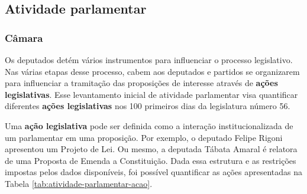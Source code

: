 \documentclass[12pt,a4paper]{article}
\begin{document}
\subsection{Atividade parlamentar}
\label{sec:atividade-parlamentar}

\subsubsection{Câmara}

Os deputados detém vários instrumentos para influenciar o processo legislativo. Nas várias etapas desse processo, cabem aos deputados e partidos se organizarem para influenciar a tramitação das proposições de interesse através de \textbf{ações legislativas}. Esse levantamento inicial de atividade parlamentar visa quantificar diferentes \textbf{ações legislativas} nos 100 primeiros dias da legislatura número 56.

Uma \textbf{ação legislativa} pode ser definida como a interação institucionalizada de um parlamentar em uma proposição. Por exemplo, o deputado Felipe Rigoni apresentou um Projeto de Lei. Ou mesmo, a deputada Tábata Amaral é relatora de uma Proposta de Emenda a Constituição. Dada essa estrutura e as restrições impostas pelos dados disponíveis, foi possível quantificar as ações apresentadas na Tabela \ref{tab:atividade-parlamentar-acao}.
\end{document}
